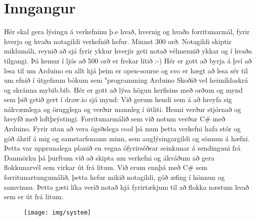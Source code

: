 \section{Inngangur}
Hér skal gera lýsingu á verkefninu þ.e hvað,  hvernig og  hvaða forritunarmál, fyrir hverja og hvaða notagildi verkefnið hefur. Minnst 300 orð. Notagildi skiptir miklumáli, reynið að sjá fyrir ykkur hverjir geti notað vélmennið ykkar og í hvaða tilgangi.  Þá kemur í ljós að 500 orð er frekar lítið :-) Hér er gott að byrja á því að lesa til um Arduino en allt hjá þeim er open-sourse og svo er hægt að lesa sér til um efnið í útgefnum bókum sem "programming Arduino \cite{monk} Skoðið vel heimildaskrá og skránna mybib.bib. Hér er gott að lýsa högun kerfisins með orðum og mynd sem þið getið gert í draw.io sjá mynd: 
Við gerum hendi sem á að hreyfa sig nákvæmlega og örugglega og verður mannleg í útliti. Henni verður stjórnað og hreyfð  með  loftþrýstingi. Forritunarmálið sem við notum verður C# með Arduino.
Fyrir utan að vera ógeðslega cool þá mun þetta verkefni hafa stór og góð áhrif á mig og samstarfsmann minn, sem auglýsingargildi og sönnun á hæfni. Þetta var upprunalega planið en vegna ófyrirséðrar seinkunar á sendinguni frá Danmörku þá þurftum við að skipta um verkefni og ákváðum að gera flokkunarvél sem virkar út frá litum. Við erum ennþá með C# sem forritunartungumálið, þetta hefur mikið notagildi, góð æfing í hönnun og samvinnu. Þetta gæti líka verið notað hjá fyrirtækjum til að flokka næstum hvað sem er út frá litum.
\begin{figure}[h]
\texttt{[image: img/system]}
\end{figure}
